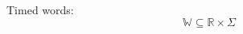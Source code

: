 
\begin{definition}\label{definition:TimedWord}
    Timed words:
    $$\mathbb{W}\subseteq\mathbb{R}\times\Sigma$$
\end{definition}